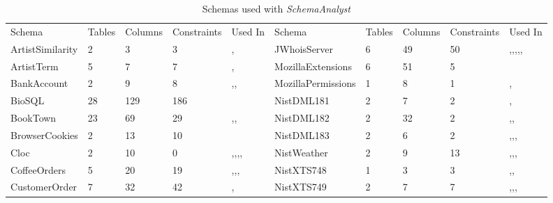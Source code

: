 \begin{table*}[t]
\scriptsize
\centering
\caption{Schemas used with \textit{SchemaAnalyst}}
\label{tab:schemas}
\begin{tabular}{llllllllll}
Schema&Tables&Columns&Constraints&Used In&Schema&Tables&Columns&Constraints&Used In \\
ArtistSimilarity&2&3&3&\cite{wright2014impact},\cite{mcminn2015effectiveness}&JWhoisServer&6&49&50&\cite{mcminn2016virtual},\cite{kapfhammer2013search},\cite{wright2013efficient},\cite{wright2014impact},\cite{mcminn2015effectiveness},\cite{kinneer2015automatically}\\
ArtistTerm&5&7&7&\cite{wright2014impact},\cite{mcminn2015effectiveness}&MozillaExtensions&6&51&5&\cite{mcminn2015effectiveness} \\
BankAccount&2&9&8&\cite{kapfhammer2013search},\cite{wright2014impact},\cite{mcminn2015effectiveness}&MozillaPermissions&1&8&1&\cite{mcminn2016virtual},\cite{mcminn2015effectiveness}\\
BioSQL&28&129&186&\cite{kinneer2015automatically}&NistDML181&2&7&2&\cite{kapfhammer2013search},\cite{mcminn2015effectiveness}  \\
BookTown&23&69&29&\cite{kapfhammer2013search},\cite{wright2014impact},\cite{mcminn2015effectiveness}&NistDML182&2&32&2&\cite{kapfhammer2013search},\cite{wright2013efficient},\cite{mcminn2015effectiveness}  \\
BrowserCookies&2&13&10&\cite{mcminn2015effectiveness}&NistDML183&2&6&2&\cite{kapfhammer2013search},\cite{wright2013efficient},\cite{wright2014impact},\cite{mcminn2015effectiveness}  \\
Cloc&2&10&0&\cite{kapfhammer2013search},\cite{wright2013efficient},\cite{wright2014impact},\cite{mcminn2015effectiveness},\cite{kinneer2015automatically}&NistWeather&2&9&13&\cite{mcminn2016virtual},\cite{kapfhammer2013search},\cite{mcminn2015effectiveness},\cite{kinneer2015automatically}\\
CoffeeOrders&5&20&19&\cite{mcminn2016virtual},\cite{kapfhammer2013search},\cite{wright2014impact},\cite{mcminn2015effectiveness}&NistXTS748&1&3&3&\cite{kapfhammer2013search},\cite{mcminn2015effectiveness},\cite{kinneer2015automatically} \\
CustomerOrder&7&32&42&\cite{kapfhammer2013search},\cite{mcminn2015effectiveness}&NistXTS749&2&7&7&\cite{kapfhammer2013search},\cite{wright2014impact},\cite{mcminn2015effectiveness},\cite{kinneer2015automatically} \\

\end{tabular}
\end{table*}

